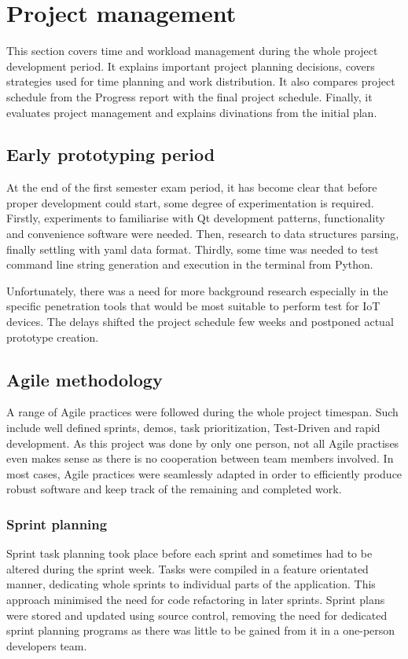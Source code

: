 \section{Project management} \label{project-man}
This section covers time and workload management during the whole project development period. It explains important project planning decisions, covers strategies used for time planning and work distribution. It also compares project schedule from the Progress report with the final project schedule. Finally, it evaluates project management and explains divinations from the initial plan.

\subsection{Early prototyping period}
	At the end of the first semester exam period, it has become clear that before proper development could start, some degree of experimentation is required. Firstly, experiments to familiarise with Qt development patterns, functionality and convenience software were needed. Then, research to data structures parsing, finally settling with yaml data format. Thirdly, some time was needed to test command line string generation and execution in the terminal from Python.
	
	Unfortunately, there was a need for more background research especially in the specific penetration tools that would be most suitable to perform test for IoT devices. The delays shifted the project schedule few weeks and postponed actual prototype creation. 
	
	\subsection{Agile methodology}
		A range of Agile practices were followed during the whole project timespan. Such include well defined sprints, demos, task prioritization, Test-Driven and rapid development. As this project was done by only one person, not all Agile practises even makes sense as there is no cooperation between team members involved. In most cases, Agile practices were seamlessly adapted in order to efficiently produce robust software and keep track of the remaining and completed work.
	
	
		\subsubsection{Sprint planning}
		Sprint task planning took place before each sprint and sometimes had to be altered during the sprint week. Tasks were compiled in a feature orientated manner, dedicating whole sprints to individual parts of the application. This approach minimised the need for code refactoring in later sprints. Sprint plans were stored and updated using source control, removing the need for dedicated sprint planning programs as there was little to be gained from it in a one-person developers team. 
		
